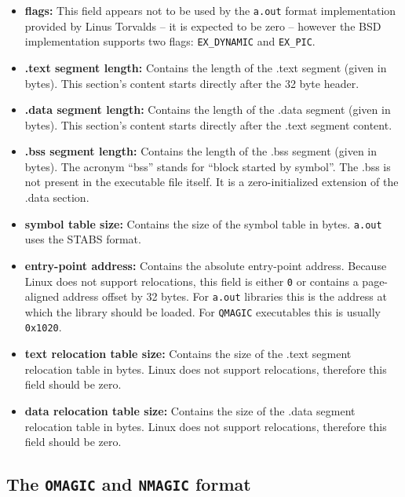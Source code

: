 \documentclass[draft,final]{vutinfth} %
\begin{document}
\begin{itemize}
\item \textbf{flags:} This field appears not to be used by the \texttt{a.out} format implementation provided by Linus Torvalds -- it is expected to be zero \cite[line 285]{BinfmtAoutC} --
however the BSD implementation supports two flags: \texttt{EX\_DYNAMIC} and \texttt{EX\_PIC}\cite{FreeBSDAoutManPage}.

\item \textbf{.text segment length:} Contains the length of the .text segment (given in bytes). This section's content starts directly after the 32 byte header.

\item \textbf{.data segment length:} Contains the length of the .data segment (given in bytes). This section's content starts directly after the .text segment content.

\item \textbf{.bss segment length:} Contains the length of the .bss segment (given in bytes). The acronym ``bss'' stands for ``block started by symbol''. The .bss is not present in the executable file itself. It is a zero-initialized extension of the .data section.

\item \textbf{symbol table size:} Contains the size of the symbol table in bytes. \texttt{a.out} uses the STABS format.

\item \textbf{entry-point address:} Contains the absolute entry-point address. Because Linux does not support relocations, this field is either \texttt{0} or contains a page-aligned address offset by 32 bytes. For \texttt{a.out} libraries this is the address at which the library should be loaded. For \texttt{QMAGIC} executables this is usually \texttt{0x1020}.

\item \textbf{text relocation table size:} Contains the size of the .text segment relocation table in bytes. Linux does not support relocations, therefore this field should be zero.

\item \textbf{data relocation table size:} Contains the size of the .data segment relocation table in bytes. Linux does not support relocations, therefore this field should be zero.
\end{itemize}

\subsection{The \texttt{OMAGIC} and \texttt{NMAGIC} format}
\label{formatdesc_onmagic}
\end{document}
